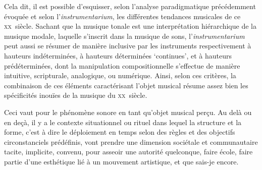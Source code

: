 \documentclass{article}
\begin{document}
Cela dit, il est possible d'esquisser, selon l'analyse paradigmatique précédemment évoquée et selon l'\textit{instrumentarium}, les différentes tendances musicales de ce \textsc{xx}\ieme ~siècle.
 Sachant que la musique tonale est une interprétation hiérarchique de la musique modale, laquelle s'inscrit dans la musique de sons, l'\textit{instrumentarium} peut aussi se résumer de manière inclusive par les instruments respectivement  %
 à hauteurs indéterminées, à hauteurs déterminées `continues', et à hauteurs prédéterminées, 
 dont la manipulation compositionnelle s'effectue de manière intuitive, scripturale, analogique, ou numérique. 
 Ainsi, selon ces critères, la combinaison de ces éléments caractérisant l'objet musical résume assez bien les spécificités inouïes de la musique du \textsc{xx}\ieme ~siècle. 
 
 Ceci vaut pour le phénomène sonore en tant qu'objet musical perçu. Au delà ou en deçà, il y a  le contexte situationnel ou rituel dans lequel la structure et la forme, c'est à dire le déploiement en temps selon des règles et des objectifs circonstanciels prédéfinis, vont prendre une dimension sociétale et communautaire %
tacite, implicite, convenu, pour asseoir une autorité quelconque, faire école, faire partie d'une esthétique lié à un mouvement artistique, et que sais-je encore.
\end{document}
